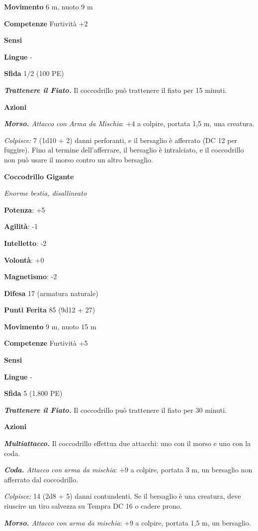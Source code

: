 \begin{multicols}{2}
\textbf{Movimento} 6 m, nuoto 9 m

\textbf{Competenze} Furtività +2

\textbf{Sensi} 

\textbf{Lingue} -

\textbf{Sfida} 1/2 (100 PE)

\emph{\textbf{Trattenere il Fiato.}} Il coccodrillo può trattenere il
fiato per 15 minuti.

\textbf{Azioni}

\emph{\textbf{Morso.} Attacco con Arma da Mischia}: +4 a colpire,
portata 1,5 m, una creatura.

\emph{Colpisce:} 7 (1d10 + 2) danni perforanti, e il bersaglio è
afferrato (DC 12 per fuggire). Fino al termine dell'afferrare, il
bersaglio è intralciato, e il coccodrillo non può usare il morso contro
un altro bersaglio.

\textbf{Coccodrillo Gigante}

\emph{Enorme bestia, disallineato}

\textbf{Potenza}: +5

\textbf{Agilità}: -1

\textbf{Intelletto}: -2

\textbf{Volontà}: +0

\textbf{Magnetismo}: -2

\textbf{Difesa} 17 (armatura naturale)

\textbf{Punti Ferita} 85 (9d12 + 27)

\textbf{Movimento} 9 m, nuoto 15 m

\textbf{Competenze} Furtività +5

\textbf{Sensi} 

\textbf{Lingue} -

\textbf{Sfida} 5 (1.800 PE)

\emph{\textbf{Trattenere il Fiato.}} Il coccodrillo può trattenere il
fiato per 30 minuti.

\textbf{Azioni}

\emph{\textbf{Multiattacco.}} Il coccodrillo effettua due attacchi: uno
con il morso e uno con la coda.

\emph{\textbf{Coda.} Attacco con arma da mischia}: +9 a colpire, portata
3 m, un bersaglio non afferrato dal coccodrillo.

\emph{Colpisce:} 14 (2d8 + 5) danni contundenti. Se il bersaglio è una
creatura, deve riuscire un tiro salvezza su Tempra DC 16 o cadere prono.

\emph{\textbf{Morso.} Attacco con arma da mischia}: +9 a colpire,
portata 1,5 m, un bersaglio.


\end{multicols}
